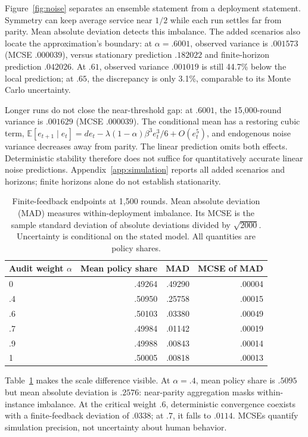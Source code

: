 \documentclass{article}
\begin{document}
Figure~\ref{fig:noise} separates an ensemble statement from a deployment statement. Symmetry can keep average service near $1/2$ while each run settles far from parity. Mean absolute deviation detects this imbalance. The added scenarios also locate the approximation's boundary: at $\alpha=.6001$, observed variance is $.001573$ (MCSE $.000039$), versus stationary prediction $.182022$ and finite-horizon prediction $.042026$. At $.61$, observed variance $.001019$ is still 44.7\% below the local prediction; at $.65$, the discrepancy is only 3.1\%, comparable to its Monte Carlo uncertainty.

Longer runs do not close the near-threshold gap: at $.6001$, the 15,000-round variance is $.001629$ (MCSE $.000039$). The conditional mean has a restoring cubic term, $\mathbb{E}[e_{t+1}\mid e_t]=de_t-\lambda(1-\alpha)\beta^3e_t^3/6+O(e_t^5)$, and endogenous noise variance decreases away from parity. The linear prediction omits both effects. Deterministic stability therefore does not suffice for quantitatively accurate linear noise predictions. Appendix~\ref{app:simulation} reports all added scenarios and horizons; finite horizons alone do not establish stationarity.

\begin{table}[t]\centering
\caption{Finite-feedback endpoints at 1,500 rounds. Mean absolute deviation (MAD) measures within-deployment imbalance. Its MCSE is the sample standard deviation of absolute deviations divided by $\sqrt{2000}$. Uncertainty is conditional on the stated model. All quantities are policy shares.}
\label{tab:simulation}
\begin{tabular}{lrrr}\toprule
Audit weight $\alpha$ & Mean policy share & MAD & MCSE of MAD\\\midrule
0 & .49264 & .49290 & .00004\\
.4 & .50950 & .25758 & .00015\\
.6 & .50103 & .03380 & .00049\\
.7 & .49984 & .01142 & .00019\\
.9 & .49988 & .00843 & .00014\\
1 & .50005 & .00818 & .00013\\\bottomrule
\end{tabular}
\end{table}

Table~\ref{tab:simulation} makes the scale difference visible. At $\alpha=.4$, mean policy share is $.5095$ but mean absolute deviation is $.2576$: near-parity aggregation masks within-instance imbalance. At the critical weight $.6$, deterministic convergence coexists with a finite-feedback deviation of $.0338$; at $.7$, it falls to $.0114$. MCSEs quantify simulation precision, not uncertainty about human behavior.
\end{document}
